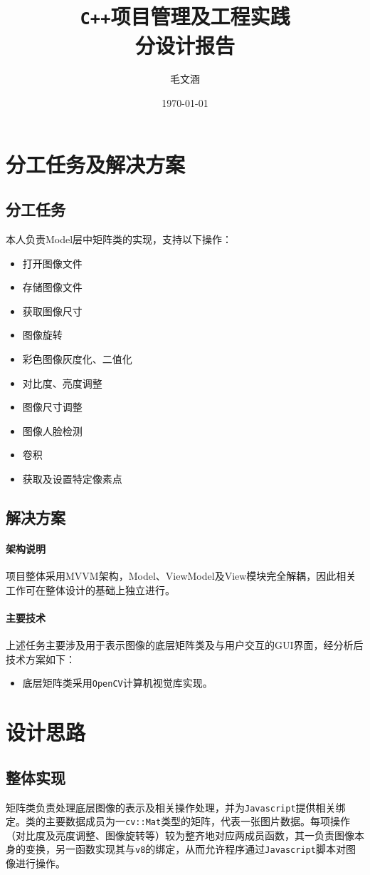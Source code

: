 \documentclass[a4paper,11pt,fontset=fandol]{article}
\title{\heiti \texttt{C++}项目管理及工程实践\\ 分设计报告}
\author{毛文涵\quad 3170105380}
\date{\today}
\begin{document}
\maketitle

\section{分工任务及解决方案}
\subsection{分工任务}
本人负责Model层中矩阵类的实现，支持以下操作：
\begin{itemize}
  \item 打开图像文件
  \item 存储图像文件
  \item 获取图像尺寸
  \item 图像旋转
  \item 彩色图像灰度化、二值化
  \item 对比度、亮度调整
  \item 图像尺寸调整
  \item 图像人脸检测
  \item 卷积
  \item 获取及设置特定像素点
\end{itemize}

\subsection{解决方案}
\paragraph{架构说明} 项目整体采用MVVM架构，Model、ViewModel及View模块完全解耦，因此相关工作可在整体设计的基础上独立进行。

\paragraph{主要技术} 上述任务主要涉及用于表示图像的底层矩阵类及与用户交互的GUI界面，经分析后技术方案如下：
\begin{itemize}
  \item 底层矩阵类采用\texttt{OpenCV}计算机视觉库实现。
\end{itemize}

\section{设计思路}
\subsection{整体实现}
矩阵类负责处理底层图像的表示及相关操作处理，并为\texttt{Javascript}提供相关绑定。类的主要数据成员为一\texttt{cv::Mat}类型的矩阵，代表一张图片数据。每项操作（对比度及亮度调整、图像旋转等）较为整齐地对应两成员函数，其一负责图像本身的变换，另一函数实现其与\texttt{v8}的绑定，从而允许程序通过\texttt{Javascript}脚本对图像进行操作。
\end{document}

